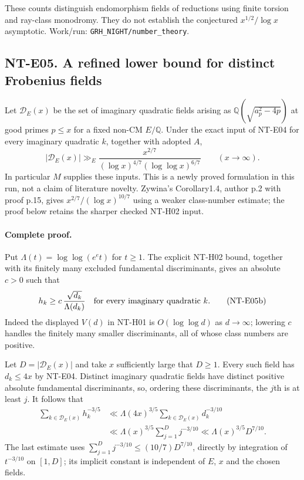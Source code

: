These counts distinguish endomorphism fields of reductions using
finite torsion and ray-class monodromy. They do not establish the
conjectured $x^{1/2}/\log x$ asymptotic. Work/run:
\texttt{GRH\_NIGHT/number\_theory}.

\subsection*{NT-E05. A refined lower bound for distinct Frobenius fields}
Let $\mathcal D_E(x)$ be the set of imaginary quadratic fields
arising as $\mathbb Q(\sqrt{a_p^2-4p})$ at good primes $p\le x$
for a fixed non-CM $E/\mathbb Q$. Under the exact input of NT-E04
for every imaginary quadratic $k$, together with adopted $A$,
\[
 |\mathcal D_E(x)|\gg_E
 \frac{x^{2/7}}
      {(\log x)^{4/7}(\log\log x)^{6/7}}
 \qquad(x\longrightarrow\infty).                         \tag{NT-E05a}
\]
In particular $M$ supplies these inputs. This is a newly proved
formulation in this run, not a claim of literature novelty.
Zywina's Corollary1.4, author p.2 with proof p.15, gives
$x^{2/7}/(\log x)^{10/7}$ using a weaker class-number estimate;
the proof below retains the sharper checked NT-H02 input.

\paragraph{Complete proof.}
Put $\Lambda(t)=\log\log(e^e t)$ for $t\ge1$. The explicit
NT-H02 bound, together with its finitely many excluded fundamental
discriminants, gives an absolute $c>0$ such that
\[
 h_k\ge c\,\frac{\sqrt{d_k}}{\Lambda(d_k)}
 \quad\hbox{for every imaginary quadratic }k.             \tag{NT-E05b}
\]
Indeed the displayed $V(d)$ in NT-H01 is $O(\log\log d)$ as
$d\to\infty$; lowering $c$ handles the finitely many smaller
discriminants, all of whose class numbers are positive.

Let $D=|\mathcal D_E(x)|$ and take $x$ sufficiently large that
$D\ge1$. Every such field has $d_k\le4x$ by NT-E04. Distinct
imaginary quadratic fields have distinct positive absolute
fundamental discriminants, so, ordering these discriminants,
the $j$th is at least $j$. It follows that
\begin{align*}
 \sum_{k\in\mathcal D_E(x)}h_k^{-3/5}
 &\ll \Lambda(4x)^{3/5}
                \sum_{k\in\mathcal D_E(x)}d_k^{-3/10}\\
 &\ll \Lambda(x)^{3/5}\sum_{j=1}^D j^{-3/10}
 \ll \Lambda(x)^{3/5}D^{7/10}.
\end{align*}
The last estimate uses
$\sum_{j=1}^D j^{-3/10}\le(10/7)D^{7/10}$, directly by integration of
$t^{-3/10}$ on $[1,D]$; its implicit constant is independent of
$E$, $x$ and the chosen fields.


